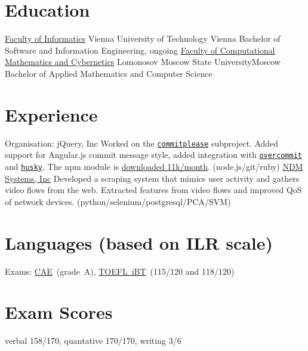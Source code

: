 \documentclass[11pt,a4paper,oneside,roman]{moderncv}
\begin{document}
\makecvtitle

\section{Education}
        {\href{http://www.informatik.tuwien.ac.at/english}{Faculty of Informatics}}
        {Vienna University of Technology}
        {Vienna}
        {Bachelor of Software and Information Engineering, ongoing}
        {}
        {\href{http://en.cs.msu.ru/}{Faculty of Computational Mathematics and Cybernetics}}
        {Lomonosov Moscow State University}{Moscow}
        {Bachelor of Applied Mathematics and Computer Science}
        {}
\section{Experience}
        {Organisation: jQuery, Inc}{}
        {}{Worked on the \texttt{\href{https://github.com/jzaefferer/commitplease/}{commitplease}} subproject. Added support for Angular.js commit message style, added integration with \texttt{\href{https://github.com/brigade/overcommit}{overcommit}} and \texttt{\href{https://github.com/typicode/husky}{husky}}. The npm module is \href{https://www.npmjs.com/package/commitplease}{downloaded 11k/month}. (node.js/git/ruby)}
        {\href{http://www.ndmsystems.com}{NDM Systems, Inc}}{}
        {}{Developed a scraping system that mimics user activity and gathers video flows from the web. Extracted features from video flows and improved QoS of network devices. (python/selenium/postgresql/PCA/SVM)}

\section{Languages \small{(based on ILR scale)}}
  {Exams:
    \href{http://www.cambridgeenglish.org/exams/advanced/}{CAE}~(grade~A),
    \href{http://www.ets.org/toefl}{TOEFL~iBT}~(115/120 and 118/120)
  }

\section{Exam Scores}
        {verbal 158/170, quantative 170/170, writing 3/6}
        {}{}{}
\end{document}

